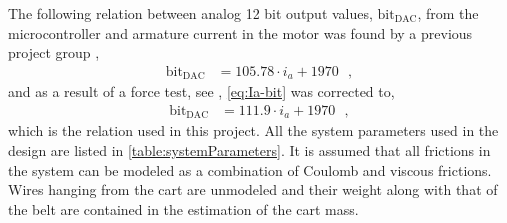 The following relation between analog 12 bit output values, $\text{bit}_\text{DAC}$, from the microcontroller and armature current in the motor was found by a previous project group \cite{JHHorgensen}, %
%
\begin{align}
  \text{bit}_\text{DAC} &= 105.78 \cdot i_{a} + 1970  \ \ \ , 
  \label{eq:Ia-bit}
\end{align}
%
and as a result of a force test, see \cite{NSVestergaard}, \autoref{eq:Ia-bit} was corrected to,
\begin{align}
  \text{bit}_\text{DAC} &= 111.9 \cdot i_{a} + 1970  \ \ \ ,
  \label{eq:Ia-bit-corrected}
\end{align}
which is the relation used in this project.
All the system parameters used in the design are listed in \autoref{table:systemParameters}. It is assumed that all frictions in the system can be modeled as a combination of Coulomb and viscous frictions. Wires hanging from the cart are unmodeled and their weight along with that of the belt are contained in the estimation of the cart mass. 

